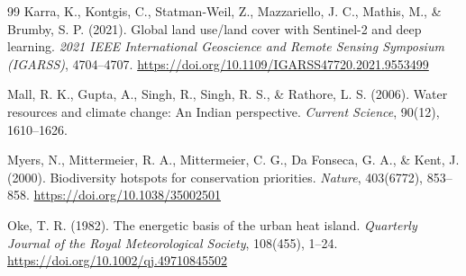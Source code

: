 \documentclass[12pt,a4paper]{article}
\begin{document}
\begin{thebibliography}{99}
Karra, K., Kontgis, C., Statman-Weil, Z., Mazzariello, J. C., Mathis, M., \& Brumby, S. P. (2021).
\newblock Global land use/land cover with Sentinel-2 and deep learning.
\newblock \textit{2021 IEEE International Geoscience and Remote Sensing Symposium (IGARSS)}, 4704--4707.
\newblock \url{https://doi.org/10.1109/IGARSS47720.2021.9553499}

Mall, R. K., Gupta, A., Singh, R., Singh, R. S., \& Rathore, L. S. (2006).
\newblock Water resources and climate change: An Indian perspective.
\newblock \textit{Current Science}, 90(12), 1610--1626.

Myers, N., Mittermeier, R. A., Mittermeier, C. G., Da Fonseca, G. A., \& Kent, J. (2000).
\newblock Biodiversity hotspots for conservation priorities.
\newblock \textit{Nature}, 403(6772), 853--858.
\newblock \url{https://doi.org/10.1038/35002501}

Oke, T. R. (1982).
\newblock The energetic basis of the urban heat island.
\newblock \textit{Quarterly Journal of the Royal Meteorological Society}, 108(455), 1--24.
\newblock \url{https://doi.org/10.1002/qj.49710845502}

\end{thebibliography}
\end{document}
